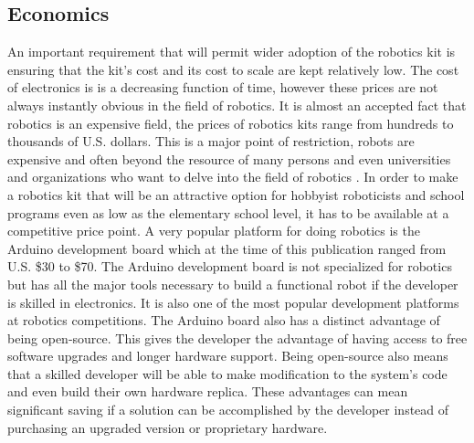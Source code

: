 \subsection{Economics} %
An important requirement that will permit wider adoption of the robotics kit is ensuring that the kit's cost and its cost to scale are kept relatively low. The cost of electronics is is a decreasing function of time, however these prices are not always instantly obvious in the field of robotics. It is almost an accepted fact that robotics is an expensive field, the prices of robotics kits range from hundreds to thousands of U.S. dollars. This is a major point of restriction, robots are expensive and often beyond the resource of many persons and even universities and organizations who want to delve into the field of robotics \cite{vr}. In order to make a robotics kit that will be an attractive option for hobbyist roboticists and school programs even as low as the elementary school level, it has to be available at a competitive price point. A very popular platform for doing robotics is the Arduino development board which at the time of this publication ranged from U.S. \$30 to \$70. The Arduino development board is not specialized for robotics but has all the major tools necessary to build a functional robot if the developer is skilled in electronics. It is also one of the most popular development platforms at robotics competitions.
The Arduino board also has a distinct advantage of being open-source. This gives the developer the advantage of having access to free software upgrades and longer hardware support. Being open-source also means that a skilled developer will be able to make modification to the system's code and even build their own hardware replica. These advantages can mean significant saving if a solution can be accomplished by the developer instead of purchasing an upgraded version or proprietary hardware.

\label{sub:economics}


